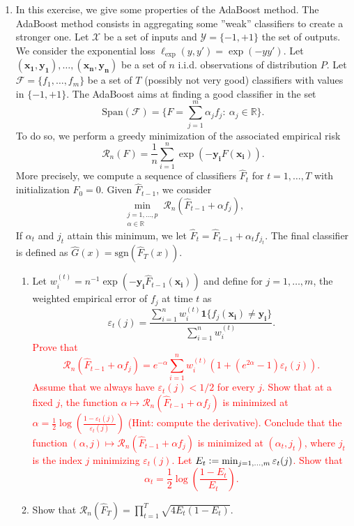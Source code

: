 \documentclass[12pt]{article}
\newcommand{\p}[1]{\left(#1 \right)}
\renewcommand{\b}[1]{\mathbf{#1 }}
\newcommand{\defeq}{\vcentcolon=}
\newcommand{\ones}{\mathbf{1}}
\newcommand{\sgn}{\mathrm{sgn}}
\newcommand{\R}{\mathbb{R}}
\newcommand{\FF}{\mathcal{F}}
\newcommand{\RR}{\mathcal{R}}
\newcommand{\XX}{\mathcal{X}}
\newcommand{\YY}{\mathcal{Y}}
\newcommand{\eps}{\varepsilon}
\begin{document}
\begin{enumerate}
\item In this exercise, we give some properties of the AdaBoost method. The AdaBoost method consists in aggregating some ''weak'' classifiers to create a stronger one. Let $\XX$ be a set of inputs and $\YY=\{-1,+1\}$ the set of outputs. We consider the exponential loss $\ell_{\exp}(y,y')=\exp(-yy')$. Let $(\b{x_1},\b{y_1}),\dots,(\b{x_n},\b{y_n})$ be a set of $n$ i.i.d. observations of distribution $P$. Let $\FF=\{f_1,\dots,f_m\}$ be a set of $T$ (possibly not very good) classifiers with values in $\{-1,+1\}$. The AdaBoost aims at finding a good classifier in the set
\[ \mathrm{Span}(\FF) = \{F=\sum_{j=1}^m \alpha_j f_j:\ \alpha_j\in \R\}.\]
To do so, we perform a greedy minimization of the associated empirical risk
\[\RR_n(F) = \frac{1}{n}\sum_{i=1}^n \exp(-\b{y_i} F(\b{x_i})).\]
More precisely, we compute a sequence of classifiers $\hat F_t$ for $t=1,\dots,T$ with initialization $\hat F_0=0$. Given $\hat F_{t-1}$, we consider
\[\min_{\substack{j=1,\dots,p \\ \alpha\in \R}}  \RR_n(\hat F_{t-1} + \alpha f_j),\]
If $\alpha_{t}$ and $j_{t}$ attain this minimum, we let $\hat F_{t} = \hat F_{t-1} + \alpha_{t} f_{j_{t}}$. The final classifier is defined as $\hat G(x) =  \sgn(\hat F_T(x))$.
\begin{enumerate}
\item Let $w_i^{(t)} = n^{-1}\exp(-\b{y_i}\hat F_{t-1}(\b{x_i}))$ and define  for $j=1,\dots,m$, the weighted empirical error of $f_j$ at time $t$ as
\[ \eps_{t}(j) = \frac{\sum_{i=1}^n w_i^{(t)} \ones\{f_j(\b{x_i})\neq \b{y_i}\}}{\sum_{i=1}^n w_i^{(t)}}.\]
\textcolor{red}{Prove that
\[  \RR_n(\hat F_{t-1} + \alpha f_j)=e^{-\alpha} \sum_{i=1}^n w_i^{(t)}(1+(e^{2\alpha}-1)\eps_t(j)).\]
Assume that we always have $\eps_{t}(j)<1/2$ for every $j$. 
Show that at a fixed $j$, the function $\alpha\mapsto \RR_n(\hat F_{t-1} + \alpha f_j)$ is minimized at $\alpha = \frac{1}{2} \log\p{\frac{1-\eps_t(j)}{\eps_t(j)}}$ (Hint: compute the derivative).
Conclude that the function $(\alpha,j)\mapsto  \RR_n(\hat F_{t-1} + \alpha f_j)$ is minimized at $(\alpha_t,j_t)$, where $j_t$ is the index $j$ minimizing $\eps_{t}(j)$. Let $E_t \defeq \min_{j=1,\dots,m} \eps_{t}(j)$. Show that 
\[ \alpha_t = \frac{1}{2} \log\p{\frac{1-E_t}{E_t}}.\]}
\item Show that $\RR_n(\hat F_T) = \prod_{t=1}^T\sqrt{4E_t(1-E_t)}$. 
\end{enumerate}

\end{enumerate}
\end{document}
